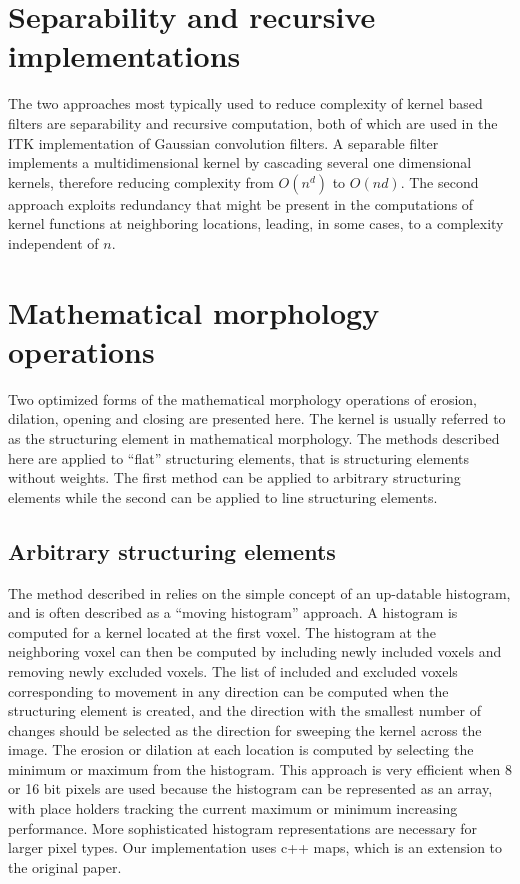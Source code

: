 \documentclass{InsightArticle}
\begin{document}
\section{Separability and recursive implementations}
The two approaches most typically used to reduce complexity of kernel
based filters are separability and recursive computation, both of
which are used in the ITK implementation of Gaussian convolution
filters. A separable filter implements a multidimensional kernel by
cascading several one dimensional kernels, therefore reducing
complexity from $O(n^d)$ to $O(nd)$. The second approach exploits
redundancy that might be present in the computations of kernel
functions at neighboring locations, leading, in some cases, to a complexity
independent of $n$.

\section{Mathematical morphology operations}
Two optimized forms of the mathematical morphology operations of
erosion, dilation, opening and closing are presented here. The kernel
is usually referred to as the structuring element in mathematical
morphology. The methods described here are applied to ``flat''
structuring elements, that is structuring elements without
weights. The first method can be applied to arbitrary structuring
elements while the second can be applied to line structuring elements.

\subsection{Arbitrary structuring elements}
\label{sect:MMmovingHist}
The method described in \cite{Vandroogenbroeck96.3} relies on the
simple concept of an up-datable histogram, and is often described as a
``moving histogram'' approach. A histogram is computed for a kernel
located at the first voxel. The histogram at the neighboring voxel can
then be computed by including newly included voxels and removing newly
excluded voxels. The list of included and excluded voxels
corresponding to movement in any direction can be computed when the
structuring element is created, and the direction with the smallest
number of changes should be selected as the direction for sweeping the
kernel across the image. The erosion or dilation at each location is
computed by selecting the minimum or maximum from the histogram. This
approach is very efficient when 8 or 16 bit pixels are used because
the histogram can be represented as an array, with place holders
tracking the current maximum or minimum increasing performance. More
sophisticated histogram representations are necessary for larger pixel
types. Our implementation uses c++ maps, which is an extension to the
original paper.
\end{document}
